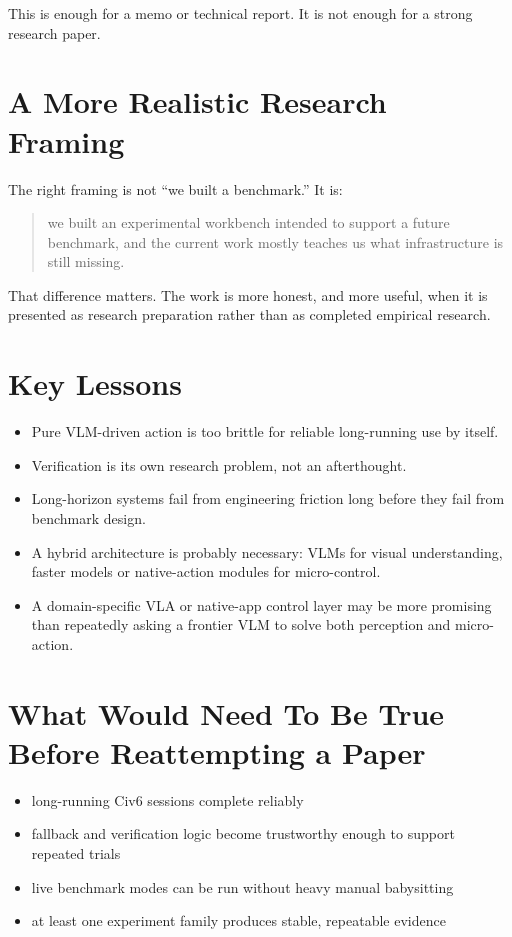 \documentclass[11pt]{article}
\begin{document}
This is enough for a memo or technical report. It is not enough for a strong research paper.

\section{A More Realistic Research Framing}

The right framing is not ``we built a benchmark.'' It is:
\begin{quote}
we built an experimental workbench intended to support a future benchmark, and the current work mostly teaches us what infrastructure is still missing.
\end{quote}

That difference matters. The work is more honest, and more useful, when it is presented as research preparation rather than as completed empirical research.

\section{Key Lessons}

\begin{itemize}[leftmargin=*]
    \item Pure VLM-driven action is too brittle for reliable long-running use by itself.
    \item Verification is its own research problem, not an afterthought.
    \item Long-horizon systems fail from engineering friction long before they fail from benchmark design.
    \item A hybrid architecture is probably necessary: VLMs for visual understanding, faster models or native-action modules for micro-control.
    \item A domain-specific VLA or native-app control layer may be more promising than repeatedly asking a frontier VLM to solve both perception and micro-action.
\end{itemize}

\section{What Would Need To Be True Before Reattempting a Paper}

\begin{itemize}[leftmargin=*]
    \item long-running Civ6 sessions complete reliably
    \item fallback and verification logic become trustworthy enough to support repeated trials
    \item live benchmark modes can be run without heavy manual babysitting
    \item at least one experiment family produces stable, repeatable evidence
\end{itemize}
\end{document}
